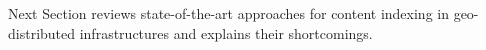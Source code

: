 Next Section reviews state-of-the-art approaches for content indexing
in geo-distributed infrastructures and explains their shortcomings.



